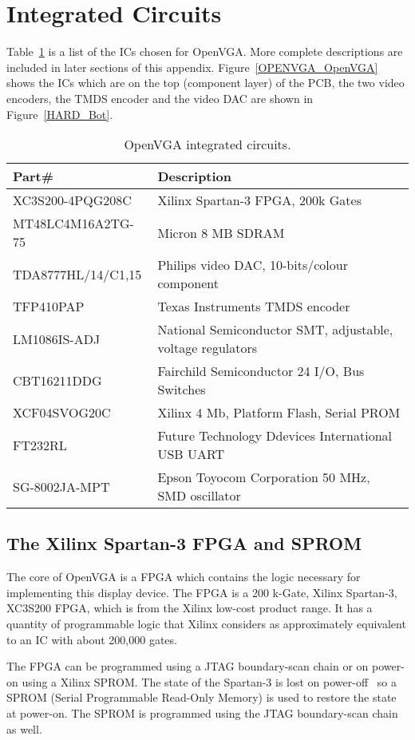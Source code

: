 \section{Integrated Circuits}
Table~\ref{HARD_ICs} is a list of the ICs chosen for OpenVGA. More complete
descriptions are included in later sections of this appendix.
Figure~\ref{OPENVGA_OpenVGA} shows the ICs which are on the top (component layer)
of the PCB, the two video encoders, the TMDS encoder and the video DAC are shown
in Figure~\ref{HARD_Bot}.

\begin{table}[h!]
\begin{tabular}{l | l}
Part\#				& Description	\\
\hline
XC3S200-4PQG208C	&	Xilinx Spartan-3 FPGA, 200k Gates	\\
MT48LC4M16A2TG-75	&	Micron 8 MB SDRAM	\\
TDA8777HL/14/C1,15	&	Philips video DAC, 10-bits/colour component	\\
TFP410PAP			&	Texas Instruments TMDS encoder		\\
LM1086IS-ADJ		&	National Semiconductor SMT, adjustable, voltage regulators	\\
CBT16211DDG			&	Fairchild Semiconductor 24 I/O, Bus Switches	\\
XCF04SVOG20C		&	Xilinx 4 Mb, Platform Flash, Serial PROM	\\
FT232RL				&	Future Technology Ddevices International USB UART	\\
SG-8002JA-MPT		&	Epson Toyocom Corporation 50 MHz, SMD oscillator	\\
\end{tabular}
\caption[OpenVGA integrated circuits]{OpenVGA integrated circuits.}
\label{HARD_ICs}
\end{table}


\subsection{The Xilinx Spartan-3 FPGA and SPROM}
The core of OpenVGA is a FPGA which contains the logic necessary for implementing
this display device. The FPGA is a 200 k-Gate, Xilinx Spartan-3, XC3S200 FPGA,
which is from the Xilinx low-cost product range. It has a quantity of
programmable logic that Xilinx considers as approximately equivalent to an IC
with about 200,000 gates.

The FPGA can be programmed using a JTAG boundary-scan chain or on power-on using a Xilinx SPROM. The
state of the Spartan-3 is lost on power-off~\cite{Xilinx_SP3_DS} so a SPROM
(Serial Programmable Read-Only Memory) is used to restore the state at power-on.
The SPROM is programmed using the JTAG boundary-scan chain as well.

